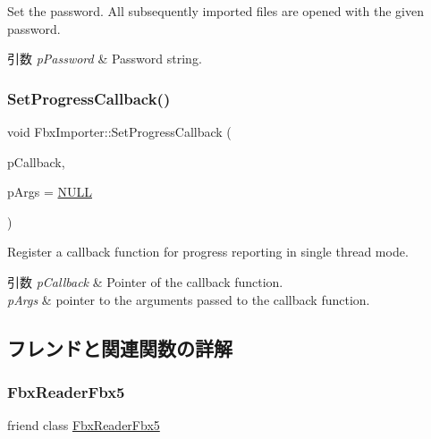 Set the password. All subsequently imported files are opened with the given password. 
\begin{DoxyParams}{引数}
{\em p\+Password} & Password string. \\
\hline
\end{DoxyParams}
\mbox{\label{class_fbx_importer_adcb26ff112db465208caefc5c5d8a6e1}} 
\subsubsection{\texorpdfstring{Set\+Progress\+Callback()}{SetProgressCallback()}}
{\footnotesize\ttfamily void Fbx\+Importer\+::\+Set\+Progress\+Callback (\begin{DoxyParamCaption}\item[{\hyperlink{fbxprogress_8h_a3765040904b462fb1f2673caba3488db}{Fbx\+Progress\+Callback}}]{p\+Callback,  }\item[{void $\ast$}]{p\+Args = {\ttfamily \hyperlink{fbxarch_8h_a070d2ce7b6bb7e5c05602aa8c308d0c4}{N\+U\+LL}} }\end{DoxyParamCaption})}

Register a callback function for progress reporting in single thread mode. 
\begin{DoxyParams}{引数}
{\em p\+Callback} & Pointer of the callback function. \\
\hline
{\em p\+Args} & pointer to the arguments passed to the callback function. \\
\hline
\end{DoxyParams}


\subsection{フレンドと関連関数の詳解}
\mbox{\label{class_fbx_importer_a66e1b4e7536dcd24ce7d7f48cf6b6e65}} 
\subsubsection{\texorpdfstring{Fbx\+Reader\+Fbx5}{FbxReaderFbx5}}
{\footnotesize\ttfamily friend class \hyperlink{class_fbx_reader_fbx5}{Fbx\+Reader\+Fbx5}\hspace{0.3cm}{\ttfamily [friend]}}

